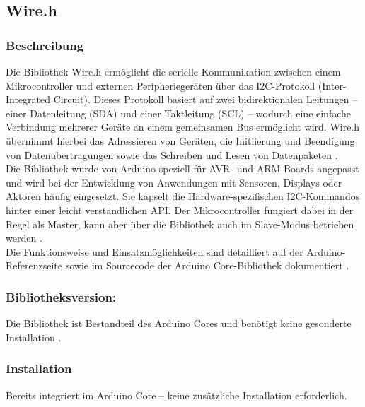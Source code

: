 \subsection{Wire.h}

\subsubsection{Beschreibung}

Die Bibliothek Wire.h ermöglicht die serielle Kommunikation zwischen einem Mikrocontroller und externen Peripheriegeräten über das I2C-Protokoll (Inter-Integrated Circuit). Dieses Protokoll basiert auf zwei bidirektionalen Leitungen – einer Datenleitung (SDA) und einer Taktleitung (SCL) – wodurch eine einfache Verbindung mehrerer Geräte an einem gemeinsamen Bus ermöglicht wird. Wire.h übernimmt hierbei das Adressieren von Geräten, die Initiierung und Beendigung von Datenübertragungen sowie das Schreiben und Lesen von Datenpaketen \cite{Arduino:2024Wire}\cite{Adafruit:2024GFXLibrary}.\\
Die Bibliothek wurde von Arduino speziell für AVR- und ARM-Boards angepasst und wird bei der Entwicklung von Anwendungen mit Sensoren, Displays oder Aktoren häufig eingesetzt. Sie kapselt die Hardware-spezifischen I2C-Kommandos hinter einer leicht verständlichen API. Der Mikrocontroller fungiert dabei in der Regel als Master, kann aber über die Bibliothek auch im Slave-Modus betrieben werden \cite{Arduino:2024Wire}\cite{Adafruit:2024GFXLibrary}.\\
\bigskip
Die Funktionsweise und Einsatzmöglichkeiten sind detailliert auf der Arduino-Referenzseite sowie im Sourcecode der Arduino Core-Bibliothek dokumentiert \cite{Arduino:2024Wire}\cite{Adafruit:2024GFXLibrary}.

\subsubsection{Bibliotheksversion:}

Die Bibliothek ist Bestandteil des Arduino Cores und benötigt keine gesonderte Installation \cite{Arduino:2024Wire}\cite{Adafruit:2024GFXLibrary}.

\subsubsection{Installation}

Bereits integriert im Arduino Core – keine zusätzliche Installation erforderlich.

